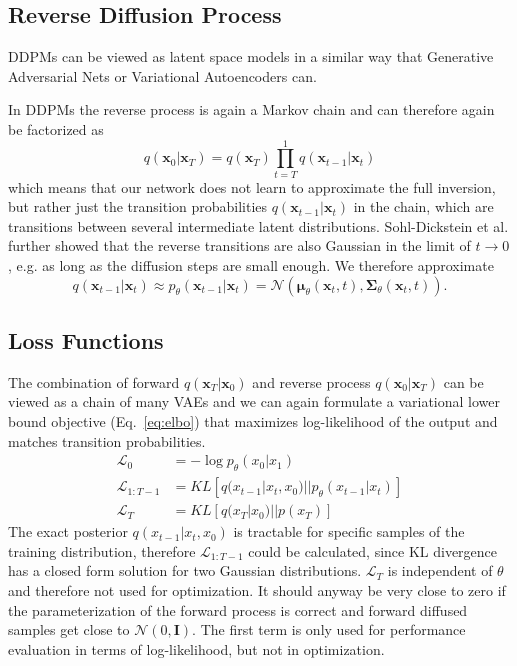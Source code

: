 \subsection{Reverse Diffusion Process}
DDPMs can be viewed as latent space models in a similar way that Generative Adversarial Nets or Variational Autoencoders can.~\autocite{goodfellow2014generative,kingma2022autoencoding}

In DDPMs the reverse process is again a Markov chain and can therefore again be factorized as
\begin{equation}
    \label{eq:reverseprocess}
    q(\bm{x}_0|\bm{x}_T) = q(\bm{x}_T) \prod_{t=T}^{1} q(\bm{x}_{t-1}|\bm{x}_{t})
\end{equation}
which means that our network does not learn to approximate the full inversion, but rather just the transition probabilities $q(\bm{x}_{t-1}|\bm{x}_{t})$ in the chain, which are transitions between several intermediate latent distributions. Sohl-Dickstein et al. further showed that the reverse transitions are also Gaussian in the limit of $t \rightarrow 0$, e.g. as long as the diffusion steps are small enough. We therefore approximate
\begin{equation}
    \label{eq:reverseapprox}
    q(\bm{x}_{t-1} | \bm{x}_t) \approx p_{\theta}(\bm{x}_{t-1} | \bm{x}_t) = \mathcal{N}(\bm{\mu}_{\theta}(\bm{x}_t, t),\bm{\Sigma}_{\theta}(\bm{x}_t, t)).
\end{equation}

\subsection{Loss Functions}
The combination of forward $q(\bm{x}_T|\bm{x}_0)$ and reverse process $q(\bm{x}_0|\bm{x}_T)$ can be viewed as a chain of many VAEs and we can again formulate a variational lower bound objective (Eq.~\ref{eq:elbo}) that maximizes log-likelihood of the output and matches transition probabilities.~\autocite{nichol2021improved}
\begin{align}
    \mathcal{L}_0       & = - \log p_{\theta}(x_0|x_1)                                    \\
    \mathcal{L}_{1:T-1} & = KL\left[q(x_{t-1}|x_t, x_0) || p_{\theta}(x_{t-1}|x_t)\right] \\
    \mathcal{L}_T       & = KL\left[q(x_T|x_0) || p(x_T)\right]
\end{align}
The exact posterior $q(x_{t-1}|x_t, x_0)$ is tractable for specific samples of the training distribution, therefore $\mathcal{L}_{1:T-1}$ could be calculated, since KL divergence has a closed form solution for two Gaussian distributions. $\mathcal{L}_T$ is independent of $\theta$ and therefore not used for optimization. It should anyway be very close to zero if the parameterization of the forward process is correct and forward diffused samples get close to $\mathcal{N}(0,\bm{I})$. The first term is only used for performance evaluation in terms of log-likelihood, but not in optimization.

